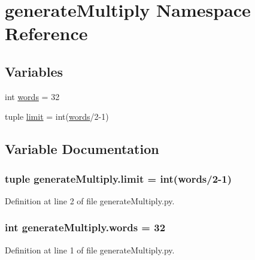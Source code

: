 \hypertarget{namespacegenerateMultiply}{\section{generate\-Multiply Namespace Reference}
\label{namespacegenerateMultiply}
}
\subsection*{Variables}
\begin{DoxyCompactItemize}
\item 
int \hyperlink{namespacegenerateMultiply_aa6dd48c6cbe1623f7677343e7897144a}{words} = 32
\item 
tuple \hyperlink{namespacegenerateMultiply_a9c5060669cbd94d6d27ff9293007cbe6}{limit} = int(\hyperlink{namespacegenerateMultiply_aa6dd48c6cbe1623f7677343e7897144a}{words}/2-\/1)
\end{DoxyCompactItemize}


\subsection{Variable Documentation}
\hypertarget{namespacegenerateMultiply_a9c5060669cbd94d6d27ff9293007cbe6}{
\subsubsection[{limit}]{\setlength{\rightskip}{0pt plus 5cm}tuple generate\-Multiply.\-limit = int({\bf words}/2-\/1)}}\label{namespacegenerateMultiply_a9c5060669cbd94d6d27ff9293007cbe6}


Definition at line 2 of file generate\-Multiply.\-py.

\hypertarget{namespacegenerateMultiply_aa6dd48c6cbe1623f7677343e7897144a}{
\subsubsection[{words}]{\setlength{\rightskip}{0pt plus 5cm}int generate\-Multiply.\-words = 32}}\label{namespacegenerateMultiply_aa6dd48c6cbe1623f7677343e7897144a}


Definition at line 1 of file generate\-Multiply.\-py.

